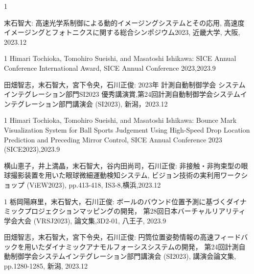 \begin{招待講演}{1}

末石智大: 高速光学系制御による動的イメージングシステムとその応用, 高速度イメージングとフォトニクスに関する総合シンポジウム2023, 近畿大学, 大阪, 2023.12

\end{招待講演}

\begin{受賞}{1}
Himari Tochioka, Tomohiro Sueishi, and Masatoshi Ishikawa: SICE Annual Conference International Award, SICE Annual Conference 2023,2023.9

田畑智志，末石智大，宮下令央，石川正俊: 2023年 計測自動制御学会 システムインテグレーション部門SI2023 優秀講演賞,第24回計測自動制御学会システムインテグレーション部門講演会 (SI2023), 新潟，2023.12

\end{受賞}

\begin{査読付}{1}
Himari Tochioka, Tomohiro Sueishi, and Masatoshi Ishikawa: Bounce Mark Visualization System for Ball Sports Judgement Using High-Speed Drop Location Prediction and Preceding Mirror Control, SICE Annual Conference 2023 (SICE2023),2023.9

横山恵子，井上満晶，末石智大，谷内田尚司，石川正俊: 非接触・非拘束型の眼球撮影装置を用いた眼球微細運動検知システム, ビジョン技術の実利用ワークショップ (ViEW2023), pp.413-418, IS3-8,横浜,2023.12

\end{査読付}

\begin{発表}{1}
栃岡陽麻里，末石智大，石川正俊: ボールのバウンド位置予測に基づくダイナミックプロジェクションマッピングの開発， 第28回日本バーチャルリアリティ学会大会 (VRSJ2023), 論文集,3D2-01, 八王子, 2023.9

田畑智志，末石智大，宮下令央，石川正俊: 円筒位置姿勢情報の高速フィードバックを用いたダイナミックアナモルフォーシスシステムの開発， 第24回計測自動制御学会システムインテグレーション部門講演会 (SI2023), 講演会論文集, pp.1280-1285, 新潟, 2023.12

\end{発表}
